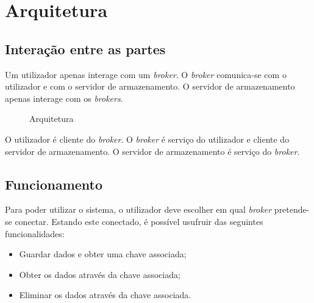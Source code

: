 \chapter{Arquitetura}

\section{Interação entre as partes}
Um utilizador apenas interage com um \textit{broker}. O \textit{broker} comunica-se com o utilizador e com o servidor de armazenamento. O servidor de armazenamento apenas interage com os \textit{brokers}.

\begin{figure}[h]
	\caption{Arquitetura}
\end{figure}

O utilizador é cliente do \textit{broker}. O \textit{broker} é serviço do utilizador e cliente do servidor de armazenamento. O servidor de armazenamento é serviço do \textit{broker}.

\section{Funcionamento}
Para poder utilizar o sistema, o utilizador deve escolher em qual \textit{broker} pretende-se conectar. Estando este conectado, é possível usufruir das seguintes funcionalidades:
\begin{itemize}
	\item Guardar dados e obter uma chave associada;
	\item Obter os dados através da chave associada;
	\item Eliminar os dados através da chave associada.
\end{itemize}

